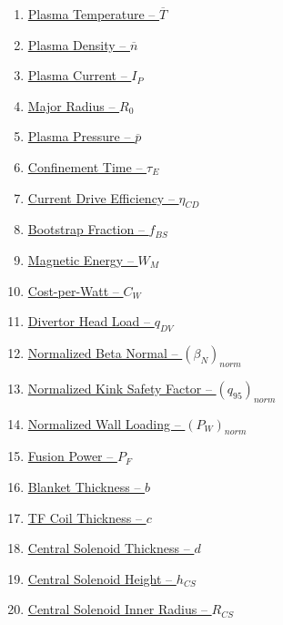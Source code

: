 \begin{enumerate}
  \item \hyperref[subsection:scan_T_bar]{ Plasma Temperature -- $\overline T$  }
  \item \hyperref[subsection:scan_n_bar]{ Plasma Density -- $\overline n$  }
  \item \hyperref[subsection:scan_I_P]{ Plasma Current -- $I_P$  }
  \item \hyperref[subsection:scan_R_0]{ Major Radius -- $R_0$  }
  \item \hyperref[subsection:scan_p_bar]{ Plasma Pressure -- $\overline p$  }
  \item \hyperref[subsection:scan_tau_E]{ Confinement Time -- $\tau_E$  }
  \item \hyperref[subsection:scan_eta_CD]{ Current Drive Efficiency -- $\eta_{CD}$  }
  \item \hyperref[subsection:scan_f_BS]{ Bootstrap Fraction  -- $f_{BS}$  }
  \item \hyperref[subsection:scan_W_M]{ Magnetic Energy -- $W_M$  }
  \item \hyperref[subsection:scan_C_W]{ Cost-per-Watt -- $C_W$  }
  \item \hyperref[subsection:scan_q_DV]{ Divertor Head Load -- $q_{DV}$  }
  \item \hyperref[subsection:scan_norm_beta_N]{ Normalized Beta Normal -- $(\beta_N)_{norm} $  }
  \item \hyperref[subsection:scan_norm_q_95]{ Normalized Kink Safety Factor -- $(q_{95})_{norm}$  }
  \item \hyperref[subsection:scan_norm_P_W]{ Normalized Wall Loading  -- $(P_W)_{norm}$  }
  \item \hyperref[subsection:scan_P_F]{ Fusion Power -- $P_F$  }
  \item \hyperref[subsection:scan_b]{ Blanket Thickness -- $b$  }
  \item \hyperref[subsection:scan_c]{ TF Coil Thickness -- $c$  }
  \item \hyperref[subsection:scan_d]{ Central Solenoid Thickness -- $d$  }
  \item \hyperref[subsection:scan_h_CS]{ Central Solenoid Height -- $h_{CS}$  }
  \item \hyperref[subsection:scan_R_CS]{ Central Solenoid Inner Radius -- $R_{CS}$ }
\end{enumerate}



\clearpage

\newpage

